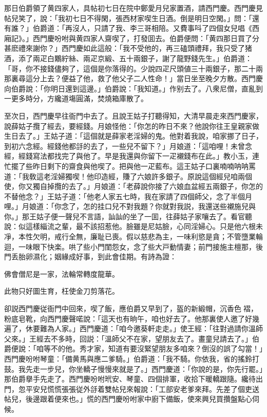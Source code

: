 那日伯爵領了黄四家人，具帖初七日在院中鄭愛月兒家置酒，請西門慶。西門慶見帖兒笑了，說：「我初七日不得閑，張西材家喫生日酒。倒是明日空閑。」問：「還有誰？」伯爵道：「再沒人，只請了我、李三哥相陪。又費事呌了四個女兒唱《西廂記》。」西門慶吩咐與黄四家人齋喫了，打發囬去。伯爵便問：「黄四那日買了分甚麽禮來謝你？」西門慶如此這般：「我不受他的，再三磕頭禮拜，我只受了猪酒，添了兩疋白鷴紵絲、兩疋京緞、五十兩銀子，謝了龍野錢先生。」伯爵道：「哥，你不接錢儘夠了，這個是你落得的。少說四疋尺頭値三十兩銀子，那二十兩那裏尋這分上去？便益了他，救了他父子二人性命！」當日坐至晚夕方散。西門慶向伯爵說：「你明日還到這邊。」伯爵說：「我知道。」作别去了。八衆尼僧，直亂到一更多時分，方纔道塲圓滿，焚燒箱庫散了。

至次日，西門慶早往衙門中去了。且說王姑子打聽得知，大清早晨走來西門慶家，說薛姑子攬了經去，要經錢。月娘怪他：「你怎的昨日不來？他說你往王皇親家做生日去了。」王姑子道：「這個就是薛家老淫婦的鬼。他對着我說，咱家挪了日子，到初六念經。經錢他都㧱的去了，一些兒不留下？」月娘道：「這咱哩！未曾念經，經錢寫法都找完了與他了。早是我還與你留下一疋襯錢布在此。」教小玉，連忙擺了些昨日剩下的齋食與他喫了。把與他一疋藍布。這王姑子口裏喃喃呐呐罵道：「我敎這老淫婦獨喫！他印造經，賺了六娘許多銀子。原說這個經兒咱兩個使，你又獨自掉攬的去了。」月娘道：「老薛說你接了六娘血盆經五兩銀子，你怎的不替他念？」王姑子道：「他老人家五七時，我在家請了四個師父，念了半個月哩。」月娘道：「你念了，怎的挂口兒不對我題？你就對我説，我還送些襯施兒與你。」那王姑子便一聲兒不言語，訕訕的坐了一囬，往薛姑子家嚷去了。看官聽說：似這樣緇流之輩，最不該招惹他。臉雖是尼姑臉，心同淫婦心。只是他六根未凈，本性欠明，戒行全無，廉耻已喪。假以慈悲為主，一味利慾是貪；不管墮業輪迴，一味眼下快楽。哄了些小門閨怨女，念了些大戸動情妻；前門接施主檀那，後門丢胎卵濕化；姻緣成好事，到此會佳期。有詩為證：

\begin{myquote}
佛會僧尼是一家，法輪常轉度龍華。

此物只好圖生育，枉使金刀剪落花。
\end{myquote}

卻説西門慶従衙門中回來，喫了飯，應伯爵又早到了，盔的新緞帽，沉香色𧜽褶，粉底皂靴，向西門慶聲喏說：「這天也有晌午，咱也好去了。他那裏使人邀了好幾遍了，休要難為人家。」西門慶道：「咱今邀葵軒走走。」使王經：「往對過請你溫師父來。」王經去不多時，回説：「溫師父不在家，望朋友去了。畫童兒請去了。」伯爵便說：「咱等不的他。秀才家，知道有要沒緊望朋友多咱來？倒沒的誤了勾當！」西門慶吩咐琴童：「備黄馬與應二爹騎。」伯爵道：「我不騎。你依我，省的搖鈴打鼓。我先走一步兒，你坐轎子慢慢來就是了。」西門慶道：「你說的是，你先行罷。」那伯爵擧手先走了。西門慶吩咐玳安、琴童、四個排軍，收拾下暖轎跟隨。纔待出門，忽平安兒慌慌張張従外㧱着雙帖兒來報說：「工部安老爹來拜。先差了個吏送帖兒，後邊跟着便來也。」慌的西門慶吩咐家中廚下備飯，使來興兒買攢盤點心伺候。

